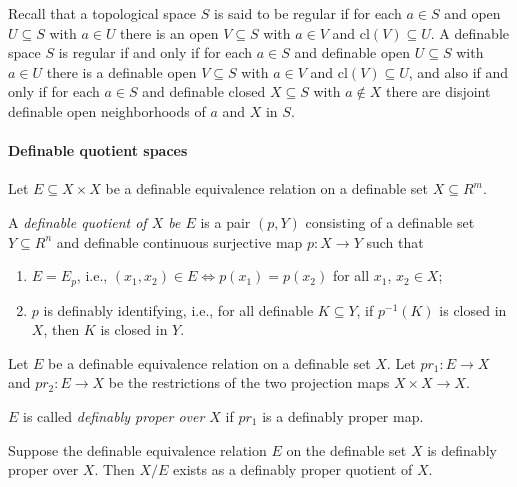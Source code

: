 \documentclass[
	fontsize=10pt, %
]{kaohandt}
\begin{document}
\begin{definition}
    Recall that a topological space $S$ is said to be regular if for each $a \in  S$ and open $U \subseteq S$ with $a \in U$ there is an open $V \subseteq S$ with $a \in V$ and $\mathrm{cl}(V) \subseteq U$. 
    A definable space $S$ is regular if and only if for each $a \in S$ and definable open $U \subseteq S$ with $a \in U$ there is a definable open $V \subseteq S$ with $a \in V$ and $\mathrm{cl}(V) \subseteq U$, 
    and also if and only if for each $a \in S$ and definable closed $X \subseteq S$ with $a \notin X$ there are disjoint definable open neighborhoods of $a$ and $X$ in $S$.
\end{definition}

\paragraph{\bfseries Definable quotient spaces}

Let $E \subseteq X\times X$ be a definable equivalence relation on a definable set $X \subseteq R^m$.

\begin{definition}
    A \emph{definable quotient of $X$ be $E$} is a pair $(p,Y)$ consisting of a definable set $Y \subseteq R^n$ and definable continuous surjective map $p: X\to Y$ such that 
    \begin{enumerate}[label = {(\roman*)}]
        \item $E = E_p$, i.e., $(x_1,x_2) \in E \iff p(x_1) = p(x_2)$ for all $x_1$, $x_2 \in X$;
        \item $p$ is definably identifying, i.e., for all definable $K \subseteq Y$, if $p^{-1}(K)$ is closed in $X$, then $K$ is closed in $Y$.
    \end{enumerate}
\end{definition}

Let $E$ be a definable equivalence relation on a definable set $X$.
Let $pr_1 : E \to X$ and $pr_2 : E \to X$ be the restrictions of the two projection maps $X\times X \to X$.

$E$ is called \emph{definably proper over $X$} if $pr_1$ is a definably proper map.

\begin{theorem}
    Suppose the definable equivalence relation $E$ on the definable set $X$ is definably proper over $X$.
    Then $X/E$ exists as a definably proper quotient of $X$.
\end{theorem}
\end{document}
